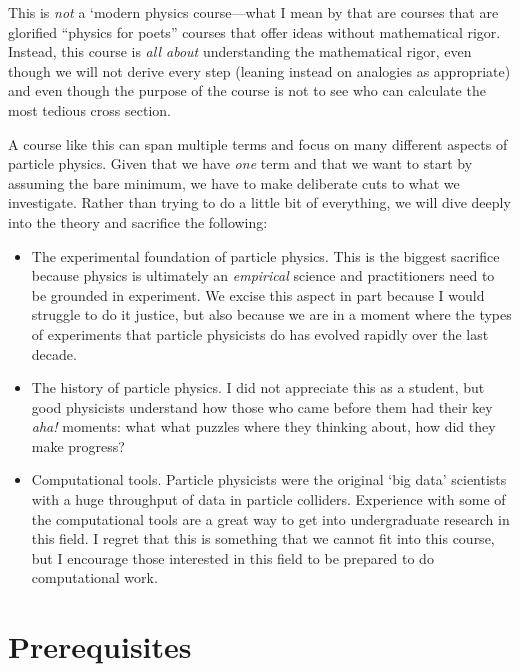 \documentclass[12pt, oneside]{report}    %
\let\oldsection\section
\def\section{%
  \setcounter{sidenote}{1}%
  \oldsection
}
\begin{document}
This is \emph{not} a `modern physics course---what I mean by that are courses that are glorified ``physics for poets'' courses that offer ideas without mathematical rigor. Instead, this course is \emph{all about} understanding the mathematical rigor, even though we will not derive every step (leaning instead on analogies as appropriate) and even though the purpose of the course is not to see who can calculate the most tedious cross section.

A course like this can span multiple terms and focus on many different aspects of particle physics. Given that we have \emph{one} term and that we want to start by assuming the bare minimum, we have to make deliberate cuts to what we investigate. Rather than trying to do a little bit of everything, we will dive deeply into the theory and sacrifice the following:
\begin{itemize}
    \item The experimental foundation of particle physics. This is the biggest sacrifice because physics is ultimately an \emph{empirical} science and practitioners need to be grounded in experiment. We excise this aspect in part because I would struggle to do it justice, but also because we are in a moment where the types of experiments that particle physicists do has evolved rapidly over the last decade.
    \item The history of particle physics. I did not appreciate this as a student, but good physicists understand how those who came before them had their key \emph{aha!} moments: what what puzzles where they thinking about, how did they make progress?
    \item Computational tools. Particle physicists were the original `big data' scientists with a huge throughput of data in particle colliders. Experience with some of the computational tools are a great way to get into undergraduate research in this field. I regret that this is something that we cannot fit into this course, but I encourage those interested in this field to be prepared to do computational work.
\end{itemize}

\section{Prerequisites}
\end{document}
